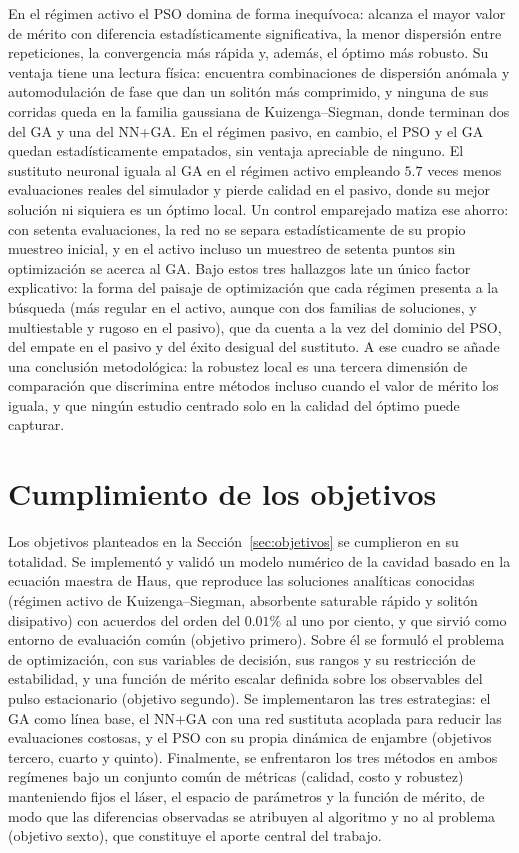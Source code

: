 En el régimen activo el PSO domina de forma inequívoca: alcanza el mayor valor de mérito
con diferencia estadísticamente significativa, la menor dispersión entre repeticiones, la
convergencia más rápida y, además, el óptimo más robusto. Su ventaja tiene una lectura
física: encuentra combinaciones de dispersión anómala y automodulación de fase que dan un
solitón más comprimido, y ninguna de sus corridas queda en la familia gaussiana de
Kuizenga--Siegman, donde terminan dos del GA y una del NN+GA. En el régimen pasivo, en cambio,
el PSO y el GA quedan estadísticamente empatados, sin ventaja apreciable de ninguno. El
sustituto neuronal iguala al GA en el régimen activo empleando $5{.}7$ veces menos
evaluaciones reales del simulador y pierde calidad en el pasivo, donde su mejor solución
ni siquiera es un óptimo local. Un control emparejado matiza ese ahorro: con setenta
evaluaciones, la red no se separa estadísticamente de su propio muestreo inicial, y en el
activo incluso un muestreo de setenta puntos sin optimización se acerca al GA. Bajo estos tres hallazgos late un único factor explicativo: la forma del
paisaje de optimización que cada régimen presenta a la búsqueda (más regular en el activo,
aunque con dos familias de soluciones, y multiestable y rugoso en el pasivo), que da cuenta a la vez del dominio del
PSO, del empate en el pasivo y del éxito desigual del sustituto. A ese cuadro se añade una
conclusión metodológica: la robustez local es una tercera dimensión de comparación que
discrimina entre métodos incluso cuando el valor de mérito los iguala, y que ningún estudio
centrado solo en la calidad del óptimo puede capturar.

\section{Cumplimiento de los objetivos}
\label{sec:conc_objetivos}

Los objetivos planteados en la Sección~\ref{sec:objetivos} se cumplieron en su totalidad.
Se implementó y validó un modelo numérico de la cavidad basado en la ecuación maestra de
Haus, que reproduce las soluciones analíticas conocidas (régimen activo de
Kuizenga--Siegman, absorbente saturable rápido y solitón disipativo) con acuerdos del
orden del $0.01\%$ al uno por ciento, y que sirvió como entorno de evaluación común
(objetivo primero). Sobre él se formuló el problema de optimización, con sus variables de
decisión, sus rangos y su restricción de estabilidad, y una función de mérito escalar
definida sobre los observables del pulso estacionario (objetivo segundo). Se implementaron
las tres estrategias: el GA como línea base, el NN+GA con una red sustituta acoplada para
reducir las evaluaciones costosas, y el PSO con su propia dinámica de enjambre (objetivos
tercero, cuarto y quinto). Finalmente, se enfrentaron los tres métodos en ambos regímenes
bajo un conjunto común de métricas (calidad, costo y robustez) manteniendo fijos el láser,
el espacio de parámetros y la función de mérito, de modo que las diferencias observadas se
atribuyen al algoritmo y no al problema (objetivo sexto), que constituye el aporte central
del trabajo.

